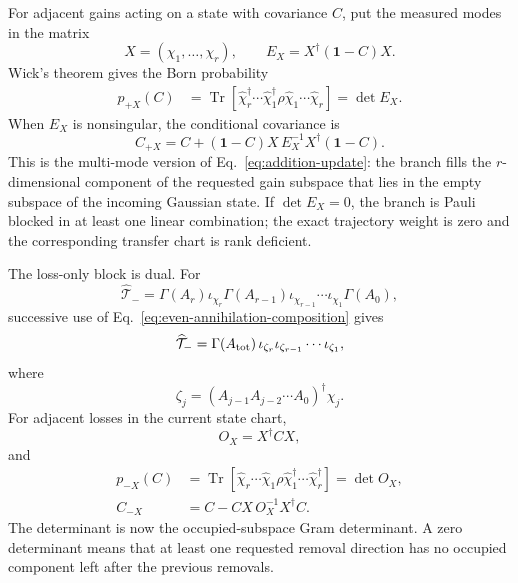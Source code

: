 \documentclass[aps,prb,onecolumn,nofootinbib,superscriptaddress]{revtex4-2}
\newcommand{\I}{\mathbf{1}}
\newcommand{\Tr}{\operatorname{Tr}}
\newcommand{\cT}{\mathcal{T}}
\theoremstyle{plain}
\theoremstyle{definition}
\begin{document}
For adjacent gains acting on a state with covariance \(C\), put the measured
modes in the matrix
\begin{equation}
  X=(\chi_1,\ldots,\chi_r),
  \qquad
  E_X=X^\dagger(\I-C)X .
  \label{eq:gain-block-empty-gram}
\end{equation}
Wick's theorem gives the Born probability
\begin{align}
  p_{+X}(C)
  &=
  \Tr\!\left[
  \hat\chi_r^\dagger\cdots\hat\chi_1^\dagger
  \rho
  \hat\chi_1\cdots\hat\chi_r
  \right]
  =
  \det E_X .
  \label{eq:many-gain-born}
\end{align}
When \(E_X\) is nonsingular, the conditional covariance is
\begin{equation}
  C_{+X}
  =
  C+(\I-C)X\,E_X^{-1}X^\dagger(\I-C).
  \label{eq:many-gain-covariance}
\end{equation}
This is the multi-mode version of Eq.~\eqref{eq:addition-update}: the branch
fills the \(r\)-dimensional component of the requested gain subspace that
lies in the empty subspace of the incoming Gaussian state.  If
\(\det E_X=0\), the branch is Pauli blocked in at least one linear
combination; the exact trajectory weight is zero and the corresponding
transfer chart is rank deficient.

The loss-only block is dual.  For
\begin{equation}
  \widehat{\cT}_{-}
  =
  \Gamma(A_r)\iota_{\chi_r}
  \Gamma(A_{r-1})\iota_{\chi_{r-1}}\cdots
  \iota_{\chi_1}\Gamma(A_0),
  \label{eq:many-loss-word}
\end{equation}
successive use of Eq.~\eqref{eq:even-annihilation-composition} gives
\begin{equation}
  \widehat{\cT}_{-}
  =
  \Gamma(A_{\rm tot})\,
  \iota_{\zeta_r}\iota_{\zeta_{r-1}}\cdots\iota_{\zeta_1},
  \label{eq:many-loss-normal-form}
\end{equation}
where
\begin{equation}
  \zeta_j=(A_{j-1}A_{j-2}\cdots A_0)^\dagger\chi_j .
  \label{eq:transported-loss-modes}
\end{equation}
For adjacent losses in the current state chart,
\begin{equation}
  O_X=X^\dagger C X,
  \label{eq:loss-block-occupied-gram}
\end{equation}
and
\begin{align}
  p_{-X}(C)
  &=
  \Tr\!\left[
  \hat\chi_r\cdots\hat\chi_1
  \rho
  \hat\chi_1^\dagger\cdots\hat\chi_r^\dagger
  \right]
  =
  \det O_X,
  \label{eq:many-loss-born}\\
  C_{-X}
  &=
  C-CX\,O_X^{-1}X^\dagger C .
  \label{eq:many-loss-covariance}
\end{align}
The determinant is now the occupied-subspace Gram determinant.  A zero
determinant means that at least one requested removal direction has no
occupied component left after the previous removals.
\end{document}
